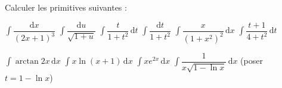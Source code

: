 
\begin{exercice}\label{exoautoanalyseCTU-47}



\medskip
Calculer les primitives suivantes :


$\displaystyle\int\dfrac{\mathrm dx}{(2x+1)^3}$ \hfill $\displaystyle\int\dfrac{\mathrm du}{\sqrt{1+u}}$ \hfill  $\displaystyle\int\dfrac{t}{1+t^2}\,\mathrm dt$  \hfill  $\displaystyle\int\dfrac{\mathrm dt}{1+t^2}$  \hfill   $\displaystyle\int\dfrac{x}{(1+x^2)^2}\,\mathrm dx$  \hfill  $\displaystyle\int\dfrac{t+1}{4+t^2}\,\mathrm dt$   


$\displaystyle\int \arctan 2x\,\mathrm dx$  \hfill  $\displaystyle\int x\ln(x+1)\,\mathrm dx$  \hfill  $\displaystyle\int xe^{2x}\,\mathrm dx$  \hfill $\displaystyle\int \dfrac{1}{x\sqrt{1-\ln x}}\,\mathrm dx$ \quad (poser $t=1-\ln x$)
 
 


\end{exercice}
